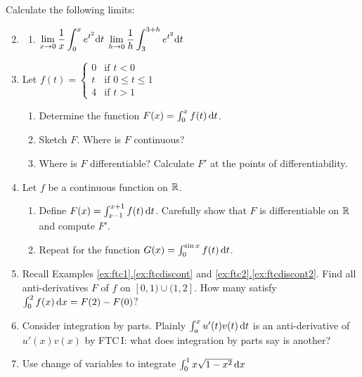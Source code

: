 \clearpage


\begin{exercises}
\exstart Calculate the following limits:
\begin{enumerate}\setcounter{enumi}{1}
  \item[]\begin{enumerate}
    \item $\displaystyle\lim_{x\to 0}\frac 1x\int_0^xe^{t^2}{\mathrm{d} t}$ \qquad{}$\displaystyle\lim_{h\to 0}\frac 1h\int_3^{3+h}e^{t^2}{\mathrm{d} t}$
  \end{enumerate}
  
  \item Let $f(t)=\begin{cases}
  0&\text{if }t<0\\
  t&\text{if }0\le t\le 1\\
  4&\text{if }t>1
  \end{cases}$
   \begin{enumerate}
    \item Determine the function $F(x)=\int_0^xf(t)\,{\mathrm{d} t}$.
    \item Sketch $F$. Where is $F$ continuous?
    \item Where is $F$ differentiable? Calculate $F'$ at the points of differentiability.
   \end{enumerate}
  
  \item Let $f$ be a continuous function on $\mathbb{R}$.
  \begin{enumerate}
    \item Define $F(x)=\int_{x-1}^{x+1}f(t)\,{\mathrm{d} t}$. Carefully show that $F$ is differentiable on $\mathbb{R}$ and compute $F'$.
    \item Repeat for the function $G(x)=\int_0^{\sin x}f(t)\,{\mathrm{d} t}$.
  \end{enumerate}
  
  \item Recall Examples \hyperref[ex:ftcdiscont]{\ref*{ex:ftc1}.\ref*{ex:ftcdiscont}} and \hyperref[ex:ftcdiscont2]{\ref*{ex:ftc2}.\ref*{ex:ftcdiscont2}}. Find all anti-derivatives $F$ of $f$ on $[0,1)\cup(1,2]$. How many satisfy $\int_0^2f(x)\,{\mathrm{d} x}=F(2)-F(0)$?
  
  \item Consider integration by parts. Plainly $\int_a^xu'(t)v(t)\,{\mathrm{d} t}$ is an anti-derivative of $u'(x)v(x)$ by FTC\,I: what does integration by parts say is another?

  \item Use change of variables to integrate $\int_0^1x\sqrt{1-x^2}\,{\mathrm{d} x}$
  

\end{enumerate}
\end{exercises}
